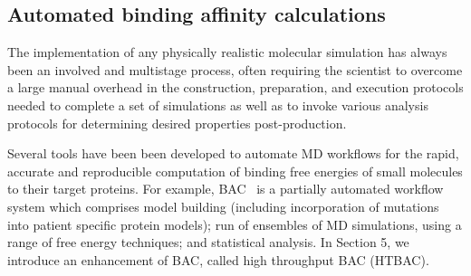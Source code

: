 
\subsection{Automated binding affinity calculations}


The implementation of any physically realistic molecular simulation has
always been an involved and multistage process, often requiring the scientist
to overcome a large manual overhead in the construction, preparation, and
execution protocols needed to complete a set of simulations as well as to
invoke various analysis protocols for determining desired properties
post-production. 

Several tools have been been developed to automate MD workflows for the rapid,
accurate and reproducible computation of binding free energies of small
molecules to their target proteins. For example, BAC~\cite{Sadiq2008} is a
partially automated workflow system which comprises model building (including
incorporation of mutations into patient specific protein models); run of
ensembles of MD simulations, using a range of free energy techniques; and
statistical analysis. In Section 5, we introduce an enhancement of BAC, called
high throughput BAC (HTBAC).





